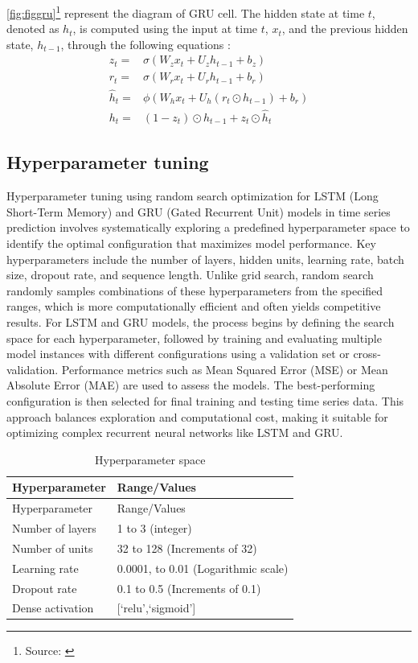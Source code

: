 \documentclass[]{interact}
\theoremstyle{plain}%
\theoremstyle{definition}
\theoremstyle{remark}
\begin{document}
\autoref{fig:figgru}\footnote{Source: \citep{vasilev2019}} represent the
diagram of GRU cell. The hidden state at time \(t\), denoted as \(h_t\),
is computed using the input at time \(t\), \(x_t\), and the previous
hidden state, \(h_{t-1}\), through the following equations
\citep{dey2017}: \begin{align}
z_t= & \sigma\left(W_z x_t+U_z h_{t-1}+b_z \right)\\
r_t= & \sigma\left(W_r x_t+U_rh_{t-1}+b_r \right)\\
\widehat{h}_t= & \phi\left(W_hx_t+U_h(r_t \odot h_{t-1})+b_r \right)\\
h_t= & (1-z_t)\odot h_{t-1}+z_t \odot \widehat{h}_{t}
\end{align}

\subsection{Hyperparameter tuning}\label{hyperparameter-tuning}

Hyperparameter tuning using random search optimization for LSTM (Long
Short-Term Memory) and GRU (Gated Recurrent Unit) models in time series
prediction involves systematically exploring a predefined hyperparameter
space to identify the optimal configuration that maximizes model
performance. Key hyperparameters include the number of layers, hidden
units, learning rate, batch size, dropout rate, and sequence length.
Unlike grid search, random search randomly samples combinations of these
hyperparameters from the specified ranges, which is more computationally
efficient and often yields competitive results. For LSTM and GRU models,
the process begins by defining the search space for each hyperparameter,
followed by training and evaluating multiple model instances with
different configurations using a validation set or cross-validation.
Performance metrics such as Mean Squared Error (MSE) or Mean Absolute
Error (MAE) are used to assess the models. The best-performing
configuration is then selected for final training and testing time
series data. This approach balances exploration and computational cost,
making it suitable for optimizing complex recurrent neural networks like
LSTM and GRU.

\begin{longtable}[]{@{}ll@{}}
\caption{Hyperparameter space}\tabularnewline
\toprule\noalign{}
Hyperparameter & Range/Values \\
\midrule\noalign{}
\endfirsthead
\toprule\noalign{}
Hyperparameter & Range/Values \\
\midrule\noalign{}
\endhead
\bottomrule\noalign{}
\endlastfoot
Number of layers & 1 to 3 (integer) \\
Number of units & 32 to 128 (Increments of 32) \\
Learning rate & 0.0001, to 0.01 (Logarithmic scale) \\
Dropout rate & 0.1 to 0.5 (Increments of 0.1) \\
Dense activation & {[}`relu',`sigmoid'{]} \\
\end{longtable}
\end{document}
